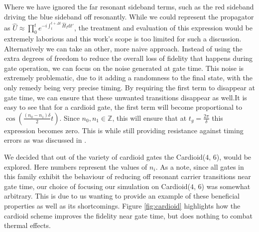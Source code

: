 \documentclass[12pt,twoside]{report}
\begin{document}
Where we have ignored the far resonant sideband terms, such as the red sideband driving the blue sideband off resonantly. While we could represent the propagator as $\hat{U}\approx \prod_0^t e^{-i\int_{t}^{t + \Delta t}\hat{H}_I\text{d}t'}$, the treatment and evaluation of this expression would be extremely laborious and this work's scope is too limited for such a discussion. Alternatively we can take an other, more naive approach. Instead of using the extra degrees of freedom to reduce the overall loss of fidelity that happens during gate operation, we can focus on the noise generated at gate time. This noise is extremely problematic, due to it adding a randomness to the final state, with the only remedy being very precise timing. By requiring the first term to disappear at gate time, we can ensure that these unwanted transitions disappear as well.It is easy to see that for a cardioid gate, the first term will become proportional to $\cos(\frac{(n_0 - n_1)\delta}{2}t)$. Since $n_0, n_1 \in \mathbb{Z}$, this will ensure that at $t_g = \frac{2\pi}{\delta}$ this expression becomes zero. This is while still providing resistance against timing errors as was discussed in \cite{Cardioid}.

We decided that out of the variety of cardioid gates the Cardioid($4$, $6$), would be explored. Here numbers represent the values of $n_i$. As a note, since all gates in this family exhibit the behaviour of reducing off resonant carrier transitions near gate time, our choice of focusing our simulation on Cardioid($4$, $6$) was somewhat arbitrary. This is due to us wanting to provide an example of these beneficial properties as well as its shortcomings. Figure \ref{fig:cardioid} highlights how the cardioid scheme improves the fidelity near gate time, but does nothing to combat thermal effects.
\end{document}
